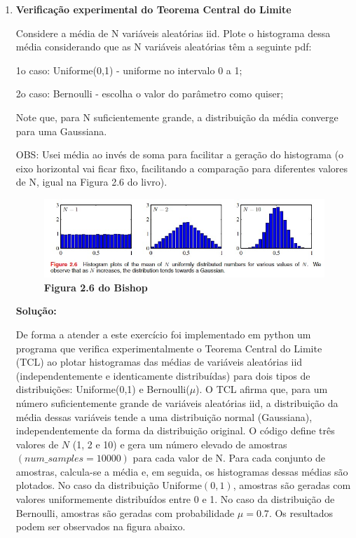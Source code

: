 \begin{enumerate}[label=E\arabic*]

\item \textbf{Verificação experimental do Teorema Central do Limite} \par
Considere a média de N variáveis aleatórias iid. Plote o histograma dessa média considerando que as N variáveis aleatórias têm a seguinte pdf:

1o caso: Uniforme(0,1) - uniforme no intervalo 0 a 1;

2o caso: Bernoulli - escolha o valor do parâmetro como quiser;

Note que, para N suficientemente grande, a distribuição da média converge para uma Gaussiana.

OBS: Usei média ao invés de soma para facilitar a geração do histograma (o eixo horizontal vai ficar fixo, facilitando a comparação para diferentes valores de N, igual na Figura 2.6 do livro).

\begin{figure}[H]
    \caption{\textbf{Figura 2.6 do Bishop}}
       \centering
       \includegraphics{bishop_26.jpg}
\end{figure}
\par
\textbf{Solução:}

De forma a atender a este exercício foi implementado em python um programa que verifica experimentalmente o Teorema Central do Limite (TCL) ao plotar histogramas das médias de variáveis aleatórias iid (independentemente e identicamente distribuídas) para dois tipos de distribuições: Uniforme(0,1) e Bernoulli($\mu$). O TCL afirma que, para um número suficientemente grande de variáveis aleatórias iid, a distribuição da média dessas variáveis tende a uma distribuição normal (Gaussiana), independentemente da forma da distribuição original. O código define três valores de $N$ (1, 2 e 10) e gera um número elevado de amostras $(num\_samples = 10000)$ para cada valor de N. Para cada conjunto de amostras, calcula-se a média e, em seguida, os histogramas dessas médias são plotados. No caso da distribuição Uniforme$(0,1)$, amostras são geradas com valores uniformemente distribuídos entre 0 e 1. No caso da distribuição de Bernoulli, amostras são geradas com probabilidade $\mu=0.7$. Os resultados podem ser observados na figura abaixo.


\end{enumerate}

